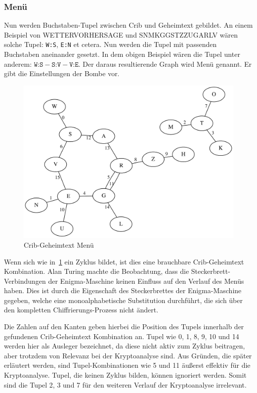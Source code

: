 \subsubsection{Menü}\label{subsubsec:menu}
Nun werden Buchstaben-Tupel zwischen Crib und Geheimtext gebildet.
An einem Beispiel von \glqq WETTERVORHERSAGE\grqq{} und \glqq SNMKGGSTZZUGARLV\grqq{} wären solche Tupel: \texttt{W:S}, \texttt{E:N} et cetera.
Nun werden die Tupel mit passenden Buchstaben aneinander gesetzt. 
In dem obigen Beispiel wären die Tupel unter anderem: $\texttt{W:S} - \texttt{S:V} - \texttt{V:E}$.
Der daraus resultierende Graph wird \glqq Menü\grqq{} genannt.
Er gibt die Einstellungen der Bombe vor.
\nopagebreak
\begin{figure}[htbp]
	\centering
	\includegraphics[width=.6\linewidth]{Turing Bomb/crib_cipher_cycle}
	\caption{Crib-Geheimtext Menü}
	\label{fig:crib_cipher_cycle}
\end{figure}

Wenn sich wie in~\cref{fig:crib_cipher_cycle} ein Zyklus bildet, ist dies eine brauchbare Crib-Geheimtext Kombination.
Alan Turing machte die Beobachtung, dass die Steckerbrett-Verbindungen der Enigma-Maschine keinen Einfluss auf den Verlauf des Menüs haben.
Dies ist durch die Eigenschaft des Steckerbrettes der Enigma-Maschine gegeben, welche eine monoalphabetische Substitution durchführt, die sich über den kompletten Chiffrierungs-Prozess nicht ändert.

Die Zahlen auf den Kanten geben hierbei die Position des Tupels innerhalb der gefundenen Crib-Geheimtext Kombination an.
Tupel wie 0, 1, 8, 9, 10 und 14 werden hier als \glqq Ausleger\grqq{} bezeichnet, da diese nicht aktiv zum Zyklus beitragen, aber trotzdem von Relevanz bei der Kryptoanalyse sind.
Aus Gründen, die später erläutert werden, sind Tupel-Kombinationen wie 5 und 11 äußerst effektiv für die Kryptoanalyse.
Tupel, die keinen Zyklus bilden, können ignoriert werden.
Somit sind die Tupel 2, 3 und 7 für den weiteren Verlauf der Kryptoanalyse irrelevant.


